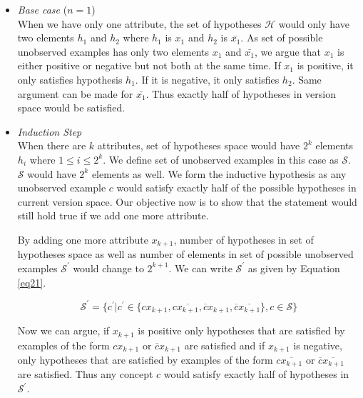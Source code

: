 \begin{itemize}
\item \textit{Base case} ($n = 1$)\\
When we have only one attribute, the set of hypotheses $\mathcal{H}$ would only have two elements $h_1$ and $h_2$ where $h_1$ is $x_1$ and $h_2$ is $\bar{x_1}$. As set of possible unobserved examples has only two elements $x_1$ and $\bar{x_1}$, we argue that $x_1$ is either positive or negative but not both at the same time. If $x_1$ is positive, it only satisfies hypothesis $h_1$. If it is negative, it only satisfies $h_2$. Same argument can be made for $\bar{x_1}$. Thus exactly half of hypotheses in version space would be satisfied.

\item \textit{Induction Step}\\
When there are $k$ attributes, set of hypotheses space would have $2^k$ elements $h_i$ where $1 \leq i \leq 2^k$.
We define set of unobserved examples in this case as $\mathcal{S}$. $\mathcal{S}$ would have $2^k$ elements as well. We form the inductive hypothesis as any unobserved example $c$ would satisfy exactly half of the possible hypotheses in current version space. Our objective now is to show that the statement would still hold true if we add one more attribute.

By adding one more attribute $x_{k+1}$, number of hypotheses in set of hypotheses space as well as number of elements in set of possible unobserved examples $\mathcal{S}^{\prime}$ would change to $2^{k+1}$. We can write $\mathcal{S}^{\prime}$ as given by Equation \ref{eq21}.

\begin{equation}\label{eq21}
\mathcal{S}^{\prime} = \{c^{\prime} | c^{\prime} \in \{cx_{k+1}, c\overline{x_{k+1}}, \overline{c}x_{k+1}, \overline{c}\overline{x_{k+1}}\}, c \in \mathcal{S} \}
\end{equation}

Now we can argue, if $x_{k+1}$ is positive only hypotheses that are satisfied by examples of the form $cx_{k+1}$ or $\overline{c}x_{k+1}$ are satisfied and if $x_{k+1}$ is negative, only hypotheses that are satisfied by examples of the form $c\overline{x_{k+1}}$ or $\overline{c}\overline{x_{k+1}}$ are satisfied. Thus any concept $c$ would satisfy exactly half of hypotheses in $\mathcal{S}^{\prime}$.

\end{itemize}
